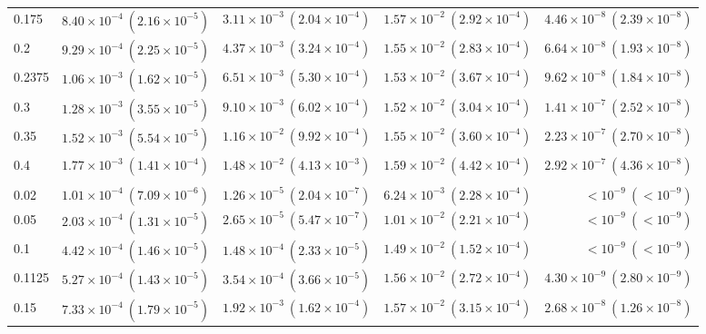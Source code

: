 \begin{table}[htbp]
\begin{tabular}{@{} l rrrr @{}}
0.175 & $8.40\!\times\!10^{-4}\ (2.16\!\times\!10^{-5})$ & $3.11\!\times\!10^{-3}\ (2.04\!\times\!10^{-4})$ & $1.57\!\times\!10^{-2}\ (2.92\!\times\!10^{-4})$ & $4.46\!\times\!10^{-8}\ (2.39\!\times\!10^{-8})$ \\
0.2 & $9.29\!\times\!10^{-4}\ (2.25\!\times\!10^{-5})$ & $4.37\!\times\!10^{-3}\ (3.24\!\times\!10^{-4})$ & $1.55\!\times\!10^{-2}\ (2.83\!\times\!10^{-4})$ & $6.64\!\times\!10^{-8}\ (1.93\!\times\!10^{-8})$ \\
0.2375 & $1.06\!\times\!10^{-3}\ (1.62\!\times\!10^{-5})$ & $6.51\!\times\!10^{-3}\ (5.30\!\times\!10^{-4})$ & $1.53\!\times\!10^{-2}\ (3.67\!\times\!10^{-4})$ & $9.62\!\times\!10^{-8}\ (1.84\!\times\!10^{-8})$ \\
0.3 & $1.28\!\times\!10^{-3}\ (3.55\!\times\!10^{-5})$ & $9.10\!\times\!10^{-3}\ (6.02\!\times\!10^{-4})$ & $1.52\!\times\!10^{-2}\ (3.04\!\times\!10^{-4})$ & $1.41\!\times\!10^{-7}\ (2.52\!\times\!10^{-8})$ \\
0.35 & $1.52\!\times\!10^{-3}\ (5.54\!\times\!10^{-5})$ & $1.16\!\times\!10^{-2}\ (9.92\!\times\!10^{-4})$ & $1.55\!\times\!10^{-2}\ (3.60\!\times\!10^{-4})$ & $2.23\!\times\!10^{-7}\ (2.70\!\times\!10^{-8})$ \\
0.4 & $1.77\!\times\!10^{-3}\ (1.41\!\times\!10^{-4})$ & $1.48\!\times\!10^{-2}\ (4.13\!\times\!10^{-3})$ & $1.59\!\times\!10^{-2}\ (4.42\!\times\!10^{-4})$ & $2.92\!\times\!10^{-7}\ (4.36\!\times\!10^{-8})$ \\
\addlinespace
\multicolumn{5}{@{}l}{\textit{Medium ($p \sim \mathcal{U}(0.1125, 0.2375)$)}} \\
0.02 & $1.01\!\times\!10^{-4}\ (7.09\!\times\!10^{-6})$ & $1.26\!\times\!10^{-5}\ (2.04\!\times\!10^{-7})$ & $6.24\!\times\!10^{-3}\ (2.28\!\times\!10^{-4})$ & $<\!10^{-9}\ (<\!10^{-9})$ \\
0.05 & $2.03\!\times\!10^{-4}\ (1.31\!\times\!10^{-5})$ & $2.65\!\times\!10^{-5}\ (5.47\!\times\!10^{-7})$ & $1.01\!\times\!10^{-2}\ (2.21\!\times\!10^{-4})$ & $<\!10^{-9}\ (<\!10^{-9})$ \\
0.1 & $4.42\!\times\!10^{-4}\ (1.46\!\times\!10^{-5})$ & $1.48\!\times\!10^{-4}\ (2.33\!\times\!10^{-5})$ & $1.49\!\times\!10^{-2}\ (1.52\!\times\!10^{-4})$ & $<\!10^{-9}\ (<\!10^{-9})$ \\
0.1125 & $5.27\!\times\!10^{-4}\ (1.43\!\times\!10^{-5})$ & $3.54\!\times\!10^{-4}\ (3.66\!\times\!10^{-5})$ & $1.56\!\times\!10^{-2}\ (2.72\!\times\!10^{-4})$ & $4.30\!\times\!10^{-9}\ (2.80\!\times\!10^{-9})$ \\
0.15 & $7.33\!\times\!10^{-4}\ (1.79\!\times\!10^{-5})$ & $1.92\!\times\!10^{-3}\ (1.62\!\times\!10^{-4})$ & $1.57\!\times\!10^{-2}\ (3.15\!\times\!10^{-4})$ & $2.68\!\times\!10^{-8}\ (1.26\!\times\!10^{-8})$ \\

\end{tabular}
\end{table}
